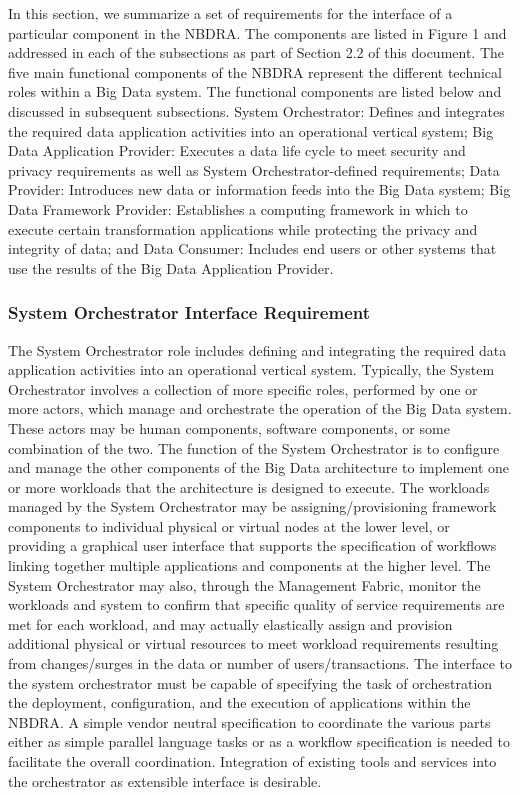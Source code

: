 \documentclass[10pt]{article}
\begin{document}
In this section, we summarize a set of requirements for the interface
of a particular component in the NBDRA. The components are listed in
Figure 1 and addressed in each of the subsections as part of Section
2.2 of this document. The five main functional components of the NBDRA
represent the different technical roles within a Big Data system. The
functional components are listed below and discussed in subsequent
subsections. System Orchestrator: Defines and integrates the required
data application activities into an operational vertical system; Big
Data Application Provider: Executes a data life cycle to meet security
and privacy requirements as well as System Orchestrator-defined
requirements; Data Provider: Introduces new data or information feeds
into the Big Data system; Big Data Framework Provider: Establishes a
computing framework in which to execute certain transformation
applications while protecting the privacy and integrity of data; and
Data Consumer: Includes end users or other systems that use the
results of the Big Data Application Provider.

\subsubsection{System Orchestrator Interface Requirement}

The System Orchestrator role includes defining and integrating the
required data application activities into an operational vertical
system. Typically, the System Orchestrator involves a collection of
more specific roles, performed by one or more actors, which manage and
orchestrate the operation of the Big Data system. These actors may be
human components, software components, or some combination of the two.
The function of the System Orchestrator is to configure and manage the
other components of the Big Data architecture to implement one or more
workloads that the architecture is designed to execute. The workloads
managed by the System Orchestrator may be assigning/provisioning
framework components to individual physical or virtual nodes at the
lower level, or providing a graphical user interface that supports the
specification of workflows linking together multiple applications and
components at the higher level. The System Orchestrator may also,
through the Management Fabric, monitor the workloads and system to
confirm that specific quality of service requirements are met for each
workload, and may actually elastically assign and provision additional
physical or virtual resources to meet workload requirements resulting
from changes/surges in the data or number of users/transactions. The
interface to the system orchestrator must be capable of specifying the
task of orchestration the deployment, configuration, and the execution
of applications within the NBDRA. A simple vendor neutral
specification to coordinate the various parts either as simple
parallel language tasks or as a workflow specification is needed to
facilitate the overall coordination. Integration of existing tools and
services into the orchestrator as extensible interface is desirable.
\end{document}
